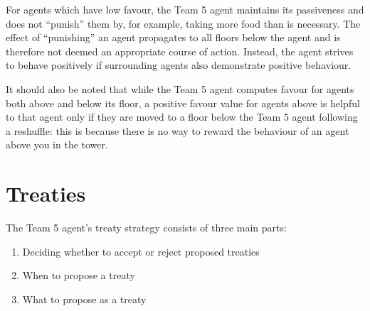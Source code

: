 For agents which have low favour, the Team 5 agent maintains its passiveness and does not ``punish'' them by, for example, taking more food than is necessary. The effect of ``punishing'' an agent propagates to all floors below the agent and is therefore not deemed an appropriate course of action. Instead, the agent strives to behave positively if surrounding agents also demonstrate positive behaviour.

It should also be noted that while the Team 5 agent computes favour for agents both above and below its floor, a positive favour value for agents above is helpful to that agent only if they are moved to a floor below the Team 5 agent following a reshuffle: this is because there is no way to reward the behaviour of an agent above you in the tower.

\section{Treaties}\label{sec:team5-treaties}
The Team 5 agent's treaty strategy consists of three main parts:
\begin{enumerate}
    \item Deciding whether to accept or reject proposed treaties
    \item When to propose a treaty
    \item What to propose as a treaty
\end{enumerate}

